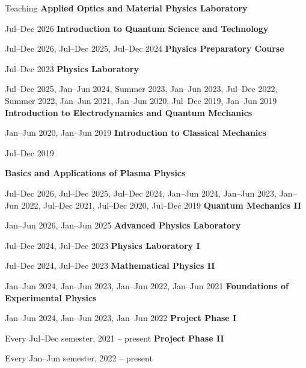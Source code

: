 \begin{rubric}{Teaching}
\entry*[PH301P] \textbf{Applied Optics and Material Physics Laboratory}\par
  {\small Jul--Dec 2026}
\entry*[PH105L] \textbf{Introduction to Quantum Science and Technology}\par
  {\small Jul--Dec 2026, Jul--Dec 2025, Jul--Dec 2024}
\entry*[PH001L] \textbf{Physics Preparatory Course}\par
  {\small Jul--Dec 2023}
\entry*[PH1103 / PH103P] \textbf{Physics Laboratory}\par
  {\small Jul--Dec 2025, Jan--Jun 2024, Summer 2023, Jan--Jun 2023, Jul--Dec 2022, Summer 2022, Jan--Jun 2021, Jan--Jun 2020, Jul--Dec 2019, Jan--Jun 2019}
\entry*[PH1202] \textbf{Introduction to Electrodynamics and Quantum Mechanics}\par
  {\small Jan--Jun 2020, Jan--Jun 2019}
\entry*[PH1101] \textbf{Introduction to Classical Mechanics}\par
  {\small Jul--Dec 2019}

\entry*[PH605L] \textbf{Basics and Applications of Plasma Physics}\par
  {\small Jul--Dec 2026, Jul--Dec 2025, Jul--Dec 2024, Jan--Jun 2024, Jan--Jun 2023, Jan--Jun 2022, Jul--Dec 2021, Jul--Dec 2020, Jul--Dec 2019}
\entry*[PH511L] \textbf{Quantum Mechanics II}\par
  {\small Jan--Jun 2026, Jan--Jun 2025}
\entry*[PH603P] \textbf{Advanced Physics Laboratory}\par
  {\small Jul--Dec 2024, Jul--Dec 2023}
\entry*[PH508P] \textbf{Physics Laboratory I}\par
  {\small Jul--Dec 2024, Jul--Dec 2023}
\entry*[PH507L] \textbf{Mathematical Physics II}\par
  {\small Jan--Jun 2024, Jan--Jun 2023, Jan--Jun 2022, Jan--Jun 2021}
\entry*[PH702L] \textbf{Foundations of Experimental Physics}\par
  {\small Jan--Jun 2024, Jan--Jun 2023, Jan--Jun 2022}
\entry*[PH691G] \textbf{Project Phase I}\par
  {\small Every Jul--Dec semester, 2021 -- present}
\entry*[PH692G] \textbf{Project Phase II}\par
  {\small Every Jan--Jun semester, 2022 -- present}
\end{rubric}
